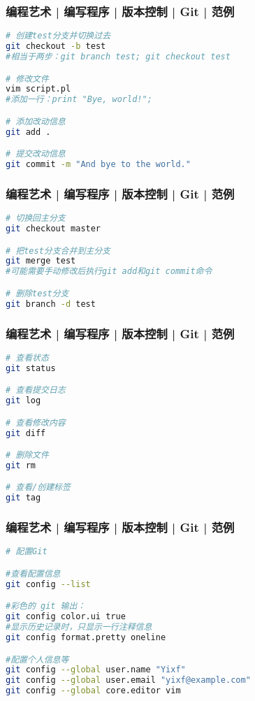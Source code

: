 \begin{frame}[fragile]
  \frametitle{编程艺术 | 编写程序 | 版本控制 | Git | \alert{范例}}
  \vspace{-1.5em}
\begin{lstlisting}[language=sh]
# 创建test分支并切换过去
git checkout -b test
#相当于两步：git branch test; git checkout test

# 修改文件
vim script.pl
#添加一行：print "Bye, world!";

# 添加改动信息
git add .

# 提交改动信息
git commit -m "And bye to the world."
\end{lstlisting}
\end{frame}

\begin{frame}[fragile]
  \frametitle{编程艺术 | 编写程序 | 版本控制 | Git | \alert{范例}}
\begin{lstlisting}[language=sh]
# 切换回主分支
git checkout master

# 把test分支合并到主分支
git merge test
#可能需要手动修改后执行git add和git commit命令

# 删除test分支
git branch -d test
\end{lstlisting}
\end{frame}

\begin{frame}[fragile]
  \frametitle{编程艺术 | 编写程序 | 版本控制 | Git | \alert{范例}}
  \vspace{-1.5em}
\begin{lstlisting}[language=sh]
# 查看状态
git status

# 查看提交日志
git log

# 查看修改内容
git diff

# 删除文件
git rm

# 查看/创建标签
git tag
\end{lstlisting}
\end{frame}

\begin{frame}[fragile]
  \frametitle{编程艺术 | 编写程序 | 版本控制 | Git | 范例}
  \vspace{-1.5em}
\begin{lstlisting}[language=sh]
# 配置Git

#查看配置信息
git config --list

#彩色的 git 输出：
git config color.ui true
#显示历史记录时，只显示一行注释信息
git config format.pretty oneline

#配置个人信息等
git config --global user.name "Yixf"
git config --global user.email "yixf@example.com"
git config --global core.editor vim
\end{lstlisting}
\end{frame}

